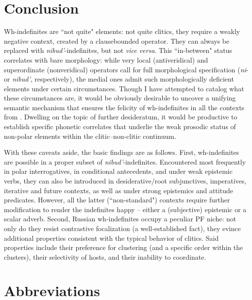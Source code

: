 \documentclass[output=paper,colorlinks,citecolor=brown]{langscibook}
\begin{document}
\section{Conclusion}

Wh-indefinites are ``not quite" elements: not quite clitics, they require a weakly negative context, created by a clausebounded operator. They can always be replaced with \textit{nibud'}-indefinites, but not \textit{vice versa}. This ``in-between" status correlates with bare morphology: while very local (antiveridical) and superordinate (nonveridical) operators call for full morphological specification (\textit{ni}- or \textit{nibud'}, respectively), the medial ones admit such morphologically deficient elements under certain circumstances. Though I have attempted to catalog what these circumstances are, it would be obviously desirable to uncover a unifying semantic mechanism that ensures the felicity of wh-indefinites in all the contexts from . Dwelling on the topic of further desideratum, it would be productive to establish specific phonetic correlates that underlie the weak prosodic status of non-polar elements within the clitic--non-clitic continuum. 

With these caveats aside, the basic findings are as follows. First, wh-indefinites are possible in a proper subset of \textit{nibud'}-indefinites. Encountered most frequently in polar interrogatives, in conditional antecedents, and under weak epistemic verbs, they can also be introduced in desiderative/root subjunctives, imperatives, iterative and future contexts, as well as under strong epistemics and attitude predicates. However, all the latter (``non-standard") contexts require further modification to render the indefinites happy -- either a (subjective) epistemic or a scalar adverb. Second, Russian wh-indefinites occupy a peculiar PF niche: not only do they resist contrastive focalization (a well-established fact), they evince additional properties consistent with the typical behavior of clitics. Said properties include their preference for clustering (and a specific order within the clusters), their selectivity of hosts, and their inability to coordinate.       


%

\section*{Abbreviations}
\end{document}
